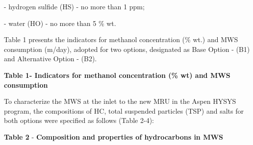 - hydrogen sulfide (HS) - no more than 1 ppm;

- water (HO) - no more than 5 \% wt.

Table 1 presents the indicators for methanol concentration (\% wt.) and
MWS consumption (m/day), adopted for two options,
designated as Base Option - (B1) and Alternative Option - (B2).

{\bfseries Table 1- Indicators for methanol concentration (\% wt) and MWS
consumption}


To characterize the MWS at the inlet to the new MRU in the Aspen HYSYS
program, the compositions of HC, total suspended particles (TSP) and
salts for both options were specified as follows (Table 2-4):

{\bfseries Table 2} - {\bfseries Composition and properties of hydrocarbons in
MWS}

